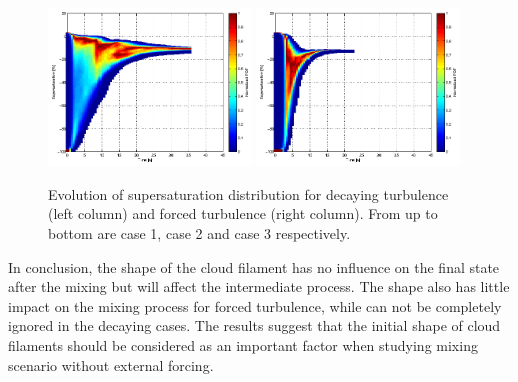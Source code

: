\documentclass[12pt]{article}
\begin{document}
\begin{figure}[H]
\includegraphics[width=0.48\textwidth]{Figures/pdf_supersat_d3}
\includegraphics[width=0.48\textwidth]{Figures/pdf_supersat_f3}
\caption{Evolution of supersaturation distribution for decaying turbulence (left column) and forced turbulence (right column). From up to bottom are case 1, case 2 and case 3 respectively.}\label{fig:supersat_distri}
\end{figure}
In conclusion, the shape of the cloud filament has no influence on the final state after the mixing but will affect the intermediate process. The shape also has little impact on the mixing process for forced turbulence, while can not be completely ignored in the decaying cases. The results suggest that the initial shape of cloud filaments should be considered as an important factor when studying mixing scenario without external forcing.



\end{document}
